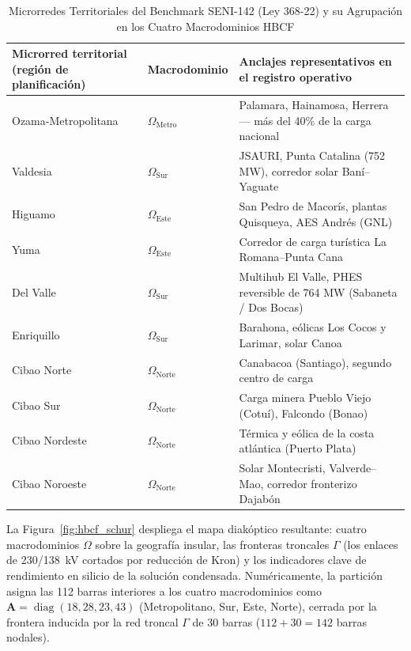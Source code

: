 \begin{table}[!t]
\caption{Microrredes Territoriales del Benchmark SENI-142 (Ley 368-22) y su Agrupación en los Cuatro Macrodominios HBCF}
\label{tab:microgrids}
\centering
\footnotesize
\begin{tabular}{@{}p{} l p{}@{}}
\toprule
\textbf{Microrred territorial (región de planificación)} & \textbf{Macrodominio} & \textbf{Anclajes representativos en el registro operativo} \\
\midrule
Ozama-Metropolitana & $\Omega_{\mathrm{Metro}}$ & Palamara, Hainamosa, Herrera --- más del 40\% de la carga nacional \\
Valdesia & $\Omega_{\mathrm{Sur}}$ & JSAURI, Punta Catalina (752 MW), corredor solar Baní--Yaguate \\
Higuamo & $\Omega_{\mathrm{Este}}$ & San Pedro de Macorís, plantas Quisqueya, AES Andrés (GNL) \\
Yuma & $\Omega_{\mathrm{Este}}$ & Corredor de carga turística La Romana--Punta Cana \\
Del Valle & $\Omega_{\mathrm{Sur}}$ & Multihub El Valle, PHES reversible de 764 MW (Sabaneta / Dos Bocas) \\
Enriquillo & $\Omega_{\mathrm{Sur}}$ & Barahona, eólicas Los Cocos y Larimar, solar Canoa \\
Cibao Norte & $\Omega_{\mathrm{Norte}}$ & Canabacoa (Santiago), segundo centro de carga \\
Cibao Sur & $\Omega_{\mathrm{Norte}}$ & Carga minera Pueblo Viejo (Cotu\'i), Falcondo (Bonao) \\
Cibao Nordeste & $\Omega_{\mathrm{Norte}}$ & Térmica y eólica de la costa atlántica (Puerto Plata) \\
Cibao Noroeste & $\Omega_{\mathrm{Norte}}$ & Solar Montecristi, Valverde--Mao, corredor fronterizo Dajabón \\
\bottomrule
\end{tabular}
\end{table}

La Figura~\ref{fig:hbcf_schur} despliega el mapa diakóptico resultante: cuatro macrodominios $\Omega$ sobre la geografía insular, las fronteras troncales $\Gamma$ (los enlaces de 230/138~kV cortados por reducción de Kron) y los indicadores clave de rendimiento en silicio de la solución condensada. Numéricamente, la partición asigna las 112 barras interiores a los cuatro macrodominios como $\mathbf{A} = \operatorname{diag}(18, 28, 23, 43)$ (Metropolitano, Sur, Este, Norte), cerrada por la frontera inducida por la red troncal $\Gamma$ de 30 barras ($112 + 30 = 142$ barras nodales).

